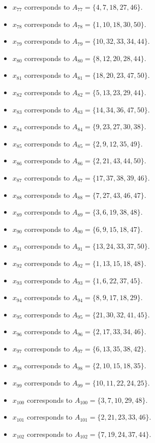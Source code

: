 \documentclass[11pt]{article}
\begin{document}
\begin{itemize}
\item $x_{77}$ corresponds to $A_{77}=\{4, 7, 18, 27, 46\}$.
\item $x_{78}$ corresponds to $A_{78}=\{1, 10, 18, 30, 50\}$.
\item $x_{79}$ corresponds to $A_{79}=\{10, 32, 33, 34, 44\}$.
\item $x_{80}$ corresponds to $A_{80}=\{8, 12, 20, 28, 44\}$.
\item $x_{81}$ corresponds to $A_{81}=\{18, 20, 23, 47, 50\}$.
\item $x_{82}$ corresponds to $A_{82}=\{5, 13, 23, 29, 44\}$.
\item $x_{83}$ corresponds to $A_{83}=\{14, 34, 36, 47, 50\}$.
\item $x_{84}$ corresponds to $A_{84}=\{9, 23, 27, 30, 38\}$.
\item $x_{85}$ corresponds to $A_{85}=\{2, 9, 12, 35, 49\}$.
\item $x_{86}$ corresponds to $A_{86}=\{2, 21, 43, 44, 50\}$.
\item $x_{87}$ corresponds to $A_{87}=\{17, 37, 38, 39, 46\}$.
\item $x_{88}$ corresponds to $A_{88}=\{7, 27, 43, 46, 47\}$.
\item $x_{89}$ corresponds to $A_{89}=\{3, 6, 19, 38, 48\}$.
\item $x_{90}$ corresponds to $A_{90}=\{6, 9, 15, 18, 47\}$.
\item $x_{91}$ corresponds to $A_{91}=\{13, 24, 33, 37, 50\}$.
\item $x_{92}$ corresponds to $A_{92}=\{1, 13, 15, 18, 48\}$.
\item $x_{93}$ corresponds to $A_{93}=\{1, 6, 22, 37, 45\}$.
\item $x_{94}$ corresponds to $A_{94}=\{8, 9, 17, 18, 29\}$.
\item $x_{95}$ corresponds to $A_{95}=\{21, 30, 32, 41, 45\}$.
\item $x_{96}$ corresponds to $A_{96}=\{2, 17, 33, 34, 46\}$.
\item $x_{97}$ corresponds to $A_{97}=\{6, 13, 35, 38, 42\}$.
\item $x_{98}$ corresponds to $A_{98}=\{2, 10, 15, 18, 35\}$.
\item $x_{99}$ corresponds to $A_{99}=\{10, 11, 22, 24, 25\}$.
\item $x_{100}$ corresponds to $A_{100}=\{3, 7, 10, 29, 48\}$.
\item $x_{101}$ corresponds to $A_{101}=\{2, 21, 23, 33, 46\}$.
\item $x_{102}$ corresponds to $A_{102}=\{7, 19, 24, 37, 44\}$.

\end{itemize}
\end{document}
